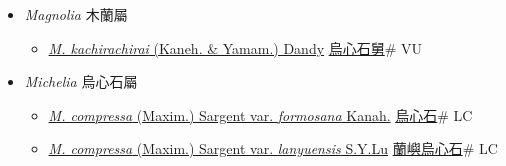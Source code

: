 
  \begin{itemize}
 \item[] \textit{Magnolia} 木蘭屬
                    
  \begin{itemize}
        \item[] \href{http://www.theplantlist.org/tpl1.1/search?q=Magnolia+kachirachirai}{\textit{M. kachirachirai} (Kaneh. \& Yamam.) Dandy}   \href{\detokenize{http://taibnet.sinica.edu.tw/chi/taibnet_species_list.php?T2=烏心石舅&T2_new_value=true&fr=y}}{烏心石舅}\# VU
  \end{itemize}
 \item[] \textit{Michelia} 烏心石屬
                    
  \begin{itemize}
        \item[] \href{http://www.theplantlist.org/tpl1.1/search?q=Michelia+compressa+var.+formosana}{\textit{M. compressa} (Maxim.) Sargent var. \textit{formosana} Kanah.}   \href{\detokenize{http://taibnet.sinica.edu.tw/chi/taibnet_species_list.php?T2=烏心石&T2_new_value=true&fr=y}}{烏心石}\# LC
        \item[] \href{http://www.theplantlist.org/tpl1.1/search?q=Michelia+compressa+var.+lanyuensis}{\textit{M. compressa} (Maxim.) Sargent var. \textit{lanyuensis} S.Y.Lu}   \href{\detokenize{http://taibnet.sinica.edu.tw/chi/taibnet_species_list.php?T2=蘭嶼烏心石&T2_new_value=true&fr=y}}{蘭嶼烏心石}\# LC
  \end{itemize}
  \end{itemize}
